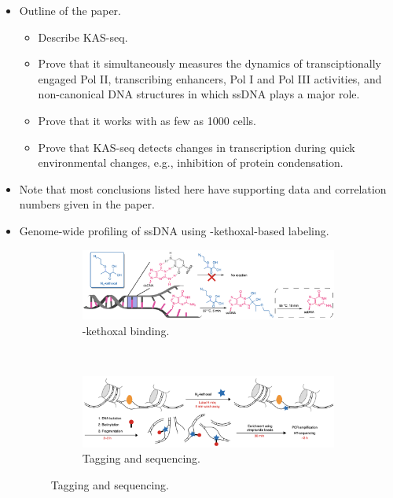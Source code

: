 \documentclass[../notes.tex]{subfiles}
\begin{document}
\begin{itemize}
    \item Outline of the paper.
    \begin{itemize}
        \item Describe KAS-seq.
        \item Prove that it simultaneously measures the dynamics of transciptionally engaged Pol II, transcribing enhancers, Pol I and Pol III activities, and non-canonical DNA structures in which ssDNA plays a major role.
        \item Prove that it works with as few as 1000 cells.
        \item Prove that KAS-seq detects changes in transcription during quick environmental changes, e.g., inhibition of protein condensation.
    \end{itemize}
    \item Note that most conclusions listed here have supporting data and correlation numbers given in the paper.
    \item Genome-wide profiling of ssDNA using -kethoxal-based labeling.
    \begin{figure}[h!]
        \centering
        \footnotesize
        \begin{subfigure}[b]{\linewidth}
            \centering
            \includegraphics[width=0.9\linewidth]{../ExtFiles/findssDNAa.png}
            \caption{-kethoxal binding.}
            \label{fig:findssDNAa}
        \end{subfigure}\\[1em]
        \begin{subfigure}[b]{\linewidth}
            \centering
            \includegraphics[width=0.9\linewidth]{../ExtFiles/findssDNAb.png}
            \caption{Tagging and sequencing.}
            \label{fig:findssDNAb}
        \end{subfigure}

\end{figure}
\end{itemize}
\end{document}

